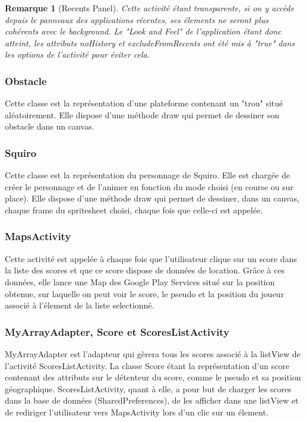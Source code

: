 \documentclass[12pt,a4paper,abstract=on,parskip=full]{scrartcl}
\newtheorem*{remark}{Remarque}
\begin{document}
\begin{remark}[Recents Panel]
Cette activité étant transparente, si on y accède depuis le panneaux des applications récentes, ses élements ne seront plus cohérents avec le background. Le "Look and Feel" de l'application étant donc atteint, les attributs noHistory et excludeFromRecents ont été mis à "true" dans les options de l'activité pour éviter cela.
\end{remark}

\subsubsection[Obstacle]{\color{blue} Obstacle}
Cette classe est la représentation d'une plateforme contenant un "trou" situé aléatoirement. Elle dispose d'une méthode draw qui permet de dessiner son obstacle dans un canvas.

\subsubsection[Squiro]{\color{blue} Squiro}
Cette classe est la représentation du personnage de Squiro. Elle est chargée de créer le personnage et de l'animer en fonction du mode choisi (en course ou sur place). Elle dispose d'une méthode draw qui permet de dessiner, dans un canvas, chaque frame du spritesheet choisi, chaque fois que celle-ci est appelée.

\subsubsection[MapsActivity]{\color{blue} MapsActivity}
Cette activité est appelée à chaque fois que l'utilisateur clique sur un score dans la liste des scores et que ce score dispose de données de location. Grâce à ces données, elle lance une Map des Google Play Services
situé sur la position obtenue, sur laquelle on peut voir le score, le pseudo et la position du joueur associé à l'élement de la liste selectionné.

\subsubsection[MyArrayAdapter, Score et ScoresListActivity]{{\color{blue} MyArrayAdapter}, {\color{blue} Score} et {\color{blue} ScoresListActivity}}
MyArrayAdapter est l'adapteur qui gèrera tous les scores associé à la listView de l'activité ScoresListActivity.
La classe Score étant la représentation d'un score contenant des attributs sur le détenteur du score, comme le pseudo et sa position géographique.
ScoresListActivity, quant à elle, a pour but de charger les scores dans la base de données (SharedPreferences), de les afficher dans une listView et de rediriger l'utilisateur vers MapsActivity lors d'un clic sur un élement.
\end{document}

